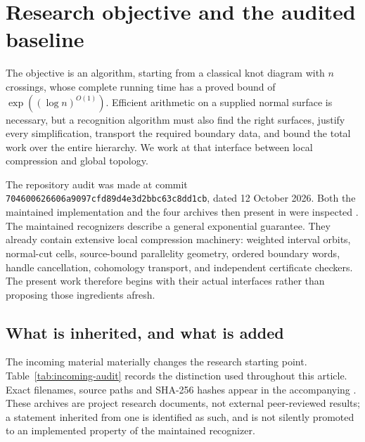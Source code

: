 \section{Research objective and the audited baseline}
\label{sec:introduction}

The objective is an algorithm, starting from a classical knot diagram with
$n$ crossings, whose complete running time has a proved bound of
$\exp((\log n)^{O(1)})$.  Efficient arithmetic on a supplied normal surface
is necessary, but a recognition algorithm must also find the right
surfaces, justify every simplification, transport the required boundary
data, and bound the total work over the entire hierarchy.  We work at that
interface between local compression and global topology.

The repository audit was made at commit
\texttt{704600626606a9097cfd89d4e3d2bbc63c8dd1cb}, dated
12 October 2026.  Both the maintained
 implementation and the four archives then
present in  were inspected \cite{ProveItPinned}.
The maintained recognizers describe a general exponential guarantee.
They already contain extensive local compression machinery: weighted
interval orbits, normal-cut cells, source-bound parallelity geometry,
ordered boundary words, handle cancellation, cohomology transport, and
independent certificate checkers.  The present work therefore begins with
their actual interfaces rather than proposing those ingredients afresh.

\subsection{What is inherited, and what is added}

The incoming material materially changes the research starting point.
Table~\ref{tab:incoming-audit} records the distinction used throughout this
article.  Exact filenames, source paths and SHA-256 hashes appear in the
accompanying .  These archives are project research
documents, not external peer-reviewed results; a statement inherited from
one is identified as such, and is not silently promoted to an implemented
property of the maintained recognizer.

